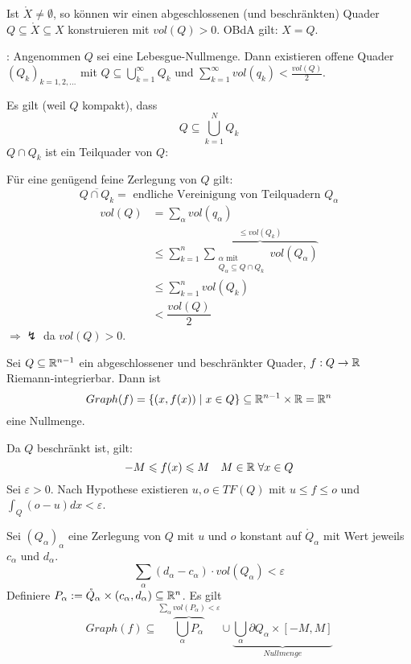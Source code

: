 \documentclass[main.tex]{subfiles}
\begin{document}
\begin{Beweis}
  Ist $\mathring{X} \neq \emptyset$, so können wir einen abgeschlossenen (und beschränkten) Quader $Q \subseteq \mathring{X} \subseteq X$ konstruieren mit $vol(Q) > 0$. OBdA gilt: $X = Q$.

  \adabs: Angenommen $Q$ sei eine Lebesgue-Nullmenge. Dann existieren offene Quader $(Q_k)_{k=1,2,...}$ mit $Q \subseteq \bigcup_{k=1}^\infty Q_k$ und $\sum \limits_{k=1}^\infty vol(q_k) < \frac{vol(Q)}{2}$.

  Es gilt (weil $Q$ kompakt), dass
  $$Q \subseteq \bigcup_{k = 1}^N Q_k$$
  $Q \cap Q_k$ ist ein Teilquader von $Q$:

  Für eine genügend feine Zerlegung von $Q$ gilt:
  $$\overline{Q \cap Q_k} = \text{ endliche Vereinigung von Teilquadern } Q_\alpha$$
  $$\begin{aligned}
    vol(Q) & = \sum \limits_\alpha vol(q_\alpha) \\
    & \leq \sum \limits_{k=1}^n \overbrace{\sum \limits_{\substack{\alpha \text{ mit}\\ Q_\alpha \subseteq Q \cap Q_k}} vol(Q_\alpha)}^{\leq vol(Q_k)} \\
    & \leq \sum \limits_{k=1}^n vol(Q_k) \\
    & < \dfrac{vol(Q)}{2}
  \end{aligned}$$
  $\Rightarrow \lightning$ da $vol(Q) > 0$.
\end{Beweis}

\begin{Theorem}
  Sei $Q \subseteq \mathbb{R}^{n-1}$ ein abgeschlossener und beschränkter Quader, $f: Q \to \mathbb{R}$ Riemann-integrierbar. Dann ist
  $$Graph(f) = \{(x,f(x)) \mid x \in Q\}\subseteq \mathbb{R}^{n-1} \times \mathbb{R} = \mathbb{R}^n$$
  eine Nullmenge.
\end{Theorem}

\begin{Beweis}
  Da $Q$ beschränkt ist, gilt:
  $$-M \leqslant f(x) \leqslant M \quad M \in \mathbb{R} \;\forall x \in Q$$
  Sei $\varepsilon > 0$. Nach Hypothese existieren $u,o \in TF(Q)$ mit $u \leq f \leq o$ und $\int_Q (o - u)dx < \varepsilon$.

  Sei $(Q_\alpha)_\alpha$ eine Zerlegung von $Q$ mit $u$ und $o$ konstant auf $\mathring{Q}_\alpha$ mit Wert jeweils $c_\alpha$ und $d_\alpha$.
  $$\sum \limits_\alpha (d_\alpha - c_\alpha) \cdot vol(Q_\alpha) < \varepsilon$$
  Definiere $P_\alpha : = \mathring{Q}_\alpha \times (c_\alpha,d_\alpha) \subseteq \mathbb{R}^n$. Es gilt
  $$Graph(f) \subseteq \overbrace{\bigcup_\alpha P_\alpha}^{\sum \limits_\alpha vol(P_\alpha) < \varepsilon} \cup \underbrace{\bigcup_\alpha \partial Q_\alpha \times [-M,M]}_{Nullmenge}$$
\end{Beweis}
\end{document}
